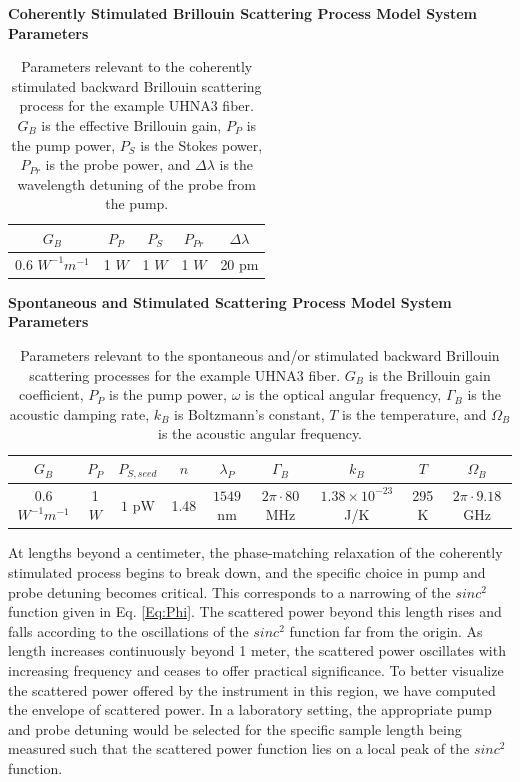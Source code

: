 \begin{table}[h]
  \centering
  \textbf{Coherently Stimulated Brillouin Scattering Process Model System Parameters}
  \renewcommand{\arraystretch}{1.2}
  \begin{tabular}{|c|c|c|c|c|}
    \hline
    $G_{B}$ & $P_{P}$ & $P_{S}$ & $P_{Pr}$ & $\Delta\lambda$ \\
    \hline
    0.6 $W^{-1} m^{-1}$ & 1 $W$ & 1 $W$ & 1 $W$ & 20 pm \\
    \hline
  \end{tabular}
  \caption{Parameters relevant to the coherently stimulated backward Brillouin scattering process for the example UHNA3 fiber. $G_{B}$ is the effective Brillouin gain, $P_{P}$ is the pump power, $P_{S}$ is the Stokes power, $P_{Pr}$ is the probe power, and $\Delta\lambda$ is the wavelength detuning of the probe from the pump.}
  \label{tab:CoBS Parameters}
\end{table}

\begin{table}[h]
  \centering
  \textbf{Spontaneous and Stimulated Scattering Process Model System Parameters}
  \renewcommand{\arraystretch}{1.2}
  \begin{tabular}{|c|c|c|c|c|c|c|c|c|}
    \hline
    $G_{B}$ & $P_{P}$ & $P_{S,seed}$ & $n$ & $\lambda_P$ & $\Gamma_{B}$ & $k_{B}$ & $T$ & $\Omega_{B}$ \\
    \hline
    0.6 $W^{-1} m^{-1}$ & 1 $W$ & $1$ pW & 1.48 & $1549$ nm & $2\pi \cdot 80$ MHz & $1.38 \times 10^{-23}$ J/K & 295 K & $2\pi \cdot 9.18$ GHz \\
    \hline
  \end{tabular}
  \caption{Parameters relevant to the spontaneous and/or stimulated backward Brillouin scattering processes for the example UHNA3 fiber. $G_{B}$ is the Brillouin gain coefficient, $P_{P}$ is the pump power, $\omega$ is the optical angular frequency, $\Gamma_{B}$ is the acoustic damping rate, $k_{B}$ is Boltzmann's constant, $T$ is the temperature, and $\Omega_{B}$ is the acoustic angular frequency.}
  \label{tab:SBS Parameters}
\end{table}

At lengths beyond a centimeter, the phase-matching relaxation of the coherently stimulated process begins to break down, and the specific choice in pump and probe detuning becomes critical. This corresponds to a narrowing of the $sinc^{2}$ function given in Eq. \ref{Eq:Phi}. The scattered power beyond this length rises and falls according to the oscillations of the $sinc^{2}$ function far from the origin. As length increases continuously beyond 1 meter, the scattered power oscillates with increasing frequency and ceases to offer practical significance. To better visualize the scattered power offered by the instrument in this region, we have computed the envelope of scattered power. In a laboratory setting, the appropriate pump and probe detuning would be selected for the specific sample length being measured such that the scattered power function lies on a local peak of the $sinc^{2}$ function.

